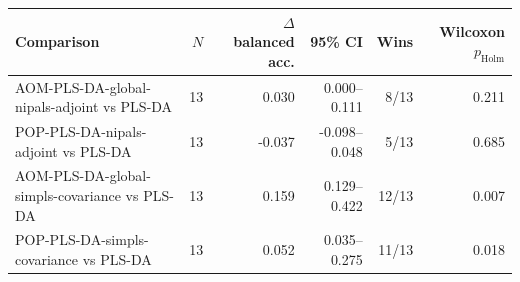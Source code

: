 \begin{tabularx}{\linewidth}{Xrrrrr}
\toprule
Comparison & $N$ & $\Delta$ balanced acc. & 95\% CI & Wins & Wilcoxon $p_{\mathrm{Holm}}$ \\
\midrule
AOM-PLS-DA-global-nipals-adjoint vs PLS-DA & 13 & 0.030 & 0.000--0.111 & 8/13 & 0.211 \\
POP-PLS-DA-nipals-adjoint vs PLS-DA & 13 & -0.037 & -0.098--0.048 & 5/13 & 0.685 \\
AOM-PLS-DA-global-simpls-covariance vs PLS-DA & 13 & 0.159 & 0.129--0.422 & 12/13 & 0.007 \\
POP-PLS-DA-simpls-covariance vs PLS-DA & 13 & 0.052 & 0.035--0.275 & 11/13 & 0.018 \\
\bottomrule
\end{tabularx}
